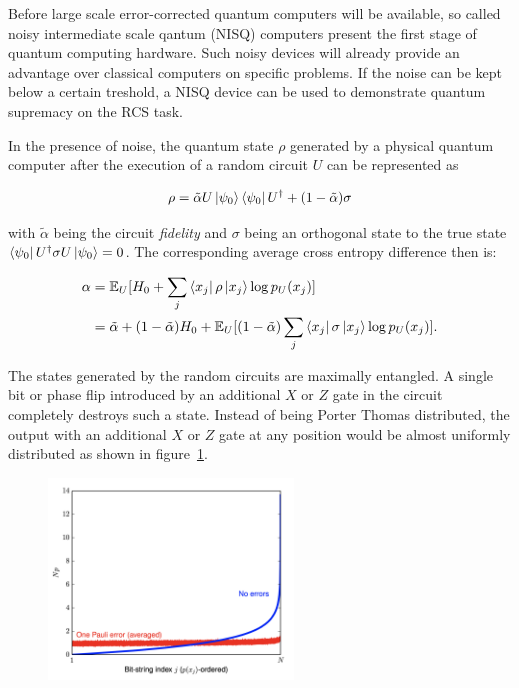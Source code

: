 Before large scale error-corrected quantum computers will be available, so
called noisy intermediate scale qantum (NISQ) computers present the first stage
of quantum computing hardware. Such noisy devices will already provide an
advantage over classical computers on specific problems. If the noise can be
kept below a certain treshold, a NISQ device can be used to demonstrate quantum
supremacy on the RCS task.

In the presence of noise, the quantum state $\rho$ generated by a physical quantum computer
after the execution of a random circuit $U$ can be represented as

\begin{equation}
  \rho = \tilde{\alpha} U \Ket{\psi_0} \Bra{\psi_0} U^{\dagger} + (1- \tilde{\alpha}) \sigma
\end{equation}

with $\tilde{\alpha}$ being the circuit \textit{fidelity} and $\sigma$ being an orthogonal state to the true state
$\Bra{\psi_0}U^{\dagger}\sigma U \Ket{\psi_0} = 0$.
The corresponding average cross entropy difference then is:

\begin{align}
  \alpha &= \mathbb{E}_U[H_0+ \sum_j \Bra{x_j} \rho \Ket{x_j} \log{p_U(x_j)} ] \\
         &= \tilde{\alpha} + (1-\tilde{\alpha})H_0 + \mathbb{E}_U[(1-\tilde{\alpha}) \sum_j \Bra{x_j} \sigma \Ket{x_j} \log{p_U(x_j)}].
\end{align}

The states generated by the random circuits are
maximally entangled. A single bit or phase flip introduced by an additional $X$
or $Z$ gate in the circuit completely destroys such a state. Instead of being
Porter Thomas distributed, the output with an additional $X$ or $Z$ gate at any
position would be almost uniformly distributed as shown in figure~\ref{fig:rcs_noise}.

\begin{figure}[H]
  \centering
  \label{fig:rcs_noise}
  \includegraphics[width=0.58\textwidth]{figures/rcs_noise}
\end{figure}

